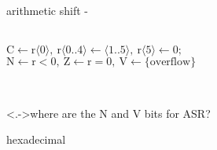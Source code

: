 \documentclass[10pt,t,svgnames]{beamer}
\makeatletter
\newlength\tightleftmargin{}
\newlength\diffleftmargin{}
\providecommand{\nextline}{
  \setlength\labelwidth{\tightleftmargin}
  \setlength\leftmargin{\tightleftmargin}
  \advance\linewidth\diffleftmargin{}
  \advance\@totalleftmargin-\diffleftmargin{}
  \parshape\@ne\@totalleftmargin\linewidth{}
  \setlength\itemsep{1.5ex}
}
\let\origdescription\description
\let\endorigdescription\enddescription
\renewenvironment{description}{\origdescription\nextline}{\endorigdescription}
\makeatother
\begin{document}
  \begin{frame}{arithmetic shift}
    \begin{description}
      \item[arithmetic shift left (asl)]\hfill \\
        $\mbox{C}\leftarrow\mbox{r}\langle0\rangle,~\mbox{r}\langle0..4\rangle\leftarrow\langle1..5\rangle,~\mbox{r}\langle5\rangle\leftarrow0;$\\
        $\mbox{N}\leftarrow\mbox{r}<0,~\mbox{Z}\leftarrow\mbox{r}=0,~\mbox{V}\leftarrow\{\mbox{overflow}\}$
      \item[arithmetic shift right (asr)]\hfill\\
    \end{description}

    \note[item]<.->{where are the N and V bits for ASR?}
  \end{frame}

  \begin{frame}{hexadecimal}
  \end{frame}
\end{document}
